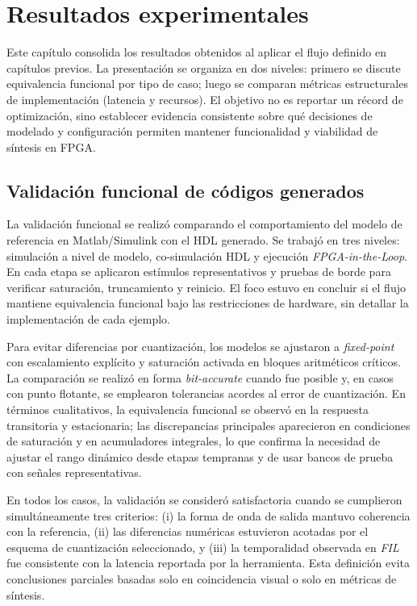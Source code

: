 \chapter{Resultados experimentales}

Este capítulo consolida los resultados obtenidos al aplicar el flujo definido en capítulos previos. La presentación se organiza en dos niveles: primero se discute equivalencia funcional por tipo de caso; luego se comparan métricas estructurales de implementación (latencia y recursos). El objetivo no es reportar un récord de optimización, sino establecer evidencia consistente sobre qué decisiones de modelado y configuración permiten mantener funcionalidad y viabilidad de síntesis en FPGA.

\section{Validación funcional de códigos generados}
La validación funcional se realizó comparando el comportamiento del modelo de referencia en Matlab/Simulink con el HDL generado. Se trabajó en tres niveles: simulación a nivel de modelo, co-simulación HDL y ejecución \textit{FPGA-in-the-Loop}. En cada etapa se aplicaron estímulos representativos y pruebas de borde para verificar saturación, truncamiento y reinicio. El foco estuvo en concluir si el flujo mantiene equivalencia funcional bajo las restricciones de hardware, sin detallar la implementación de cada ejemplo.

Para evitar diferencias por cuantización, los modelos se ajustaron a \textit{fixed-point} con escalamiento explícito y saturación activada en bloques aritméticos críticos. La comparación se realizó en forma \textit{bit-accurate} cuando fue posible y, en casos con punto flotante, se emplearon tolerancias acordes al error de cuantización. En términos cualitativos, la equivalencia funcional se observó en la respuesta transitoria y estacionaria; las discrepancias principales aparecieron en condiciones de saturación y en acumuladores integrales, lo que confirma la necesidad de ajustar el rango dinámico desde etapas tempranas y de usar bancos de prueba con señales representativas.

En todos los casos, la validación se consideró satisfactoria cuando se cumplieron simultáneamente tres criterios: (i) la forma de onda de salida mantuvo coherencia con la referencia, (ii) las diferencias numéricas estuvieron acotadas por el esquema de cuantización seleccionado, y (iii) la temporalidad observada en \textit{FIL} fue consistente con la latencia reportada por la herramienta. Esta definición evita conclusiones parciales basadas solo en coincidencia visual o solo en métricas de síntesis.

